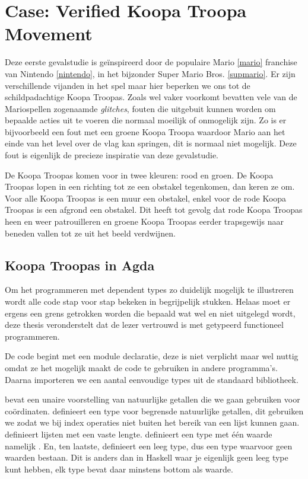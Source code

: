 \chapter{Case: Verified Koopa Troopa Movement}
\label{case:koopa}

Deze eerste gevalstudie is geïnspireerd door de populaire Mario \ref{mario}
franchise van Nintendo \ref{nintendo}, in het bijzonder Super Mario Bros.
\ref{supmario}. Er zijn verschillende vijanden in het spel maar hier beperken
we ons tot de schildpadachtige Koopa Troopas. Zoals wel vaker voorkomt bevatten
vele van de Mariospellen zogenaamde \emph{glitches}, fouten die uitgebuit
kunnen worden om bepaalde acties uit te voeren die normaal moeilijk of
onmogelijk zijn. Zo is er bijvoorbeeld een fout met een groene Koopa Troopa
waardoor Mario aan het einde van het level over de vlag kan springen, dit is
normaal niet mogelijk. Deze fout is eigenlijk de precieze inspiratie van deze
gevalstudie.

De Koopa Troopas komen voor in twee kleuren: rood en groen. De Koopa Troopas
lopen in een richting tot ze een obstakel tegenkomen, dan keren ze om. Voor
alle Koopa Troopas is een muur een obstakel, enkel voor de rode Koopa Troopas
is een afgrond een obstakel. Dit heeft tot gevolg dat rode Koopa Troopas heen
en weer patrouilleren en groene Koopa Troopas eerder trapsgewijs naar beneden
vallen tot ze uit het beeld verdwijnen.


\section{Koopa Troopas in Agda}

Om het programmeren met dependent types zo duidelijk mogelijk te illustreren
wordt alle code stap voor stap bekeken in begrijpelijk stukken. Helaas moet
er ergens een grens getrokken worden die bepaald wat wel en niet uitgelegd
wordt, deze thesis veronderstelt dat de lezer vertrouwd is met getypeerd
functioneel programmeren. 

De code begint met een module declaratie, deze is niet verplicht maar wel
nuttig omdat ze het mogelijk maakt de code te gebruiken in andere programma's.
Daarna importeren we een aantal eenvoudige types uit de standaard bibliotheek.


 bevat een unaire voorstelling van natuurlijke getallen die we
gaan gebruiken voor coördinaten.  definieert een type voor
begrensde natuurlijke getallen, dit gebruiken we zodat we bij index operaties
niet buiten het bereik van een lijst kunnen gaan.  definieert
lijsten met een vaste lengte.  definieert een type met één
waarde namelijk . En, ten laatste,  definieert
een leeg type, dus een type waarvoor geen waarden bestaan. Dit is anders dan in
Haskell waar je eigenlijk geen leeg type kunt hebben, elk type bevat daar
minstens bottom als waarde.

